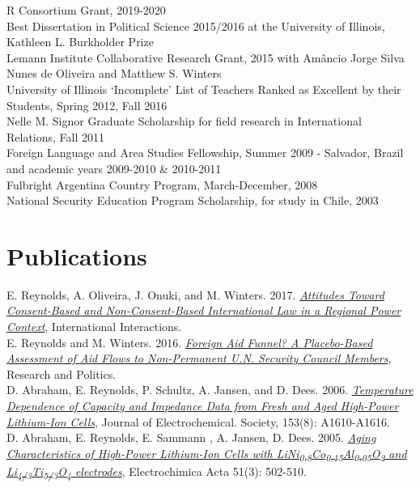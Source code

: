 \documentclass[margin, 10pt]{CVStyleTemplate}\usepackage[]{graphicx}\usepackage[dvipsnames]{xcolor}
\begin{document}
\begin{resume}
R Consortium Grant, 2019-2020\\[6pt]
Best Dissertation in Political Science 2015/2016 at the University of Illinois, Kathleen L. Burkholder Prize  \\[6pt]
Lemann Institute Collaborative Research Grant, 2015 with Am\^{a}ncio Jorge Silva Nunes de Oliveira and Matthew S. Winters\\[6pt]%
University of Illinois `Incomplete' List of Teachers Ranked as Excellent by their Students, Spring 2012, Fall 2016\\[6pt]%
Nelle M. Signor Graduate Scholarship for field research in International Relations, Fall 2011\\[6pt]%
Foreign Language and Area Studies Fellowship, Summer 2009 - Salvador, Brazil and academic years 2009-2010 \& 2010-2011\\[6pt]%
Fulbright Argentina Country Program, March-December, 2008\\[6pt]%
National Security Education Program Scholarship, for study in Chile, 2003\\[6pt]%




\section{Publications}

E. Reynolds, A. Oliveira, J. Onuki,
 and M. Winters. 2017. \emph{\href{http://www.tandfonline.com/doi/abs/10.1080/03050629.2018.1408012}{Attitudes Toward Consent-Based and Non-Consent-Based International Law in a Regional Power Context}}, International Interactions.\\[6pt]
E. Reynolds and M. Winters. 2016. \emph{\href{http://rap.sagepub.com/content/3/1/2053168015626167}{Foreign Aid Funnel? A Placebo-Based Assessment of Aid Flows to Non-Permanent U.N. Security Council Members}}, Research and Politics. \\[6pt]%
D. Abraham, E. Reynolds, P. Schultz, A. Jansen, and D. Dees. 2006. \emph{\href{http://jes.ecsdl.org/content/153/8/A1610.abstract}{Temperature Dependence of Capacity and Impedance Data from Fresh and Aged High-Power Lithium-Ion Cells}}, Journal of Electrochemical. Society, 153(8): A1610-A1616. \\[6pt]%
D. Abraham, E. Reynolds, E. Sammann , A. Jansen,  D. Dees. 2005. \emph{\href{http://www.sciencedirect.com/science/article/pii/S0013468605004433}{Aging Characteristics of High-Power Lithium-Ion Cells with LiNi\textsubscript{0.8}Co\textsubscript{0.15}Al\textsubscript{0.05}O\textsubscript{2} and Li\textsubscript{4/3}Ti\textsubscript{5/3}O\textsubscript{4} electrodes}}, Electrochimica Acta 51(3): 502-510.%


\end{resume}
\end{document}
